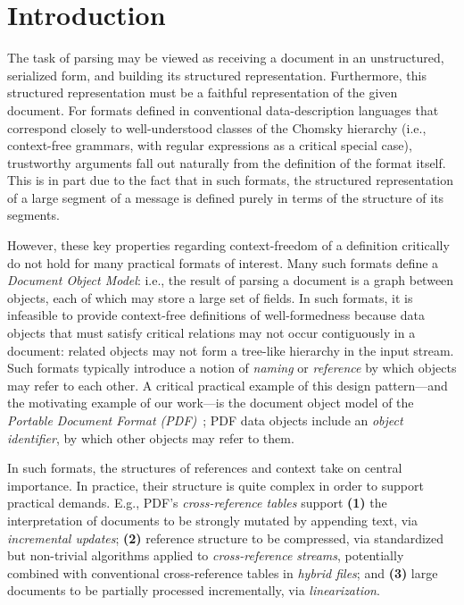 \section{Introduction}
\label{sec:intro}
The task of parsing may be viewed as receiving a document in an
unstructured, serialized form, and building its structured
representation. Furthermore, this structured representation must be a
faithful representation of the given document.
%
For formats defined in conventional data-description languages that
correspond closely to well-understood classes of the Chomsky hierarchy
(i.e., context-free grammars, with regular expressions as a critical
special case), trustworthy arguments fall out naturally from the
definition of the format itself.
%
This is in part due to the fact that in such formats, the structured
representation of a large segment of a message is defined purely in
terms of the structure of its segments.

However, these key properties regarding context-freedom of a
definition critically do not hold for many practical formats of
interest.
%
Many such formats define a \emph{Document Object Model}: i.e., the
result of parsing a document is a graph between objects, each
of which may store a large set of fields.
%
In such formats, it is infeasible to provide context-free definitions
of well-formedness because data objects that must satisfy critical
relations may not occur contiguously in a document: related objects
may not form a tree-like hierarchy in the input stream.
%
Such formats typically introduce a notion of \emph{naming} or
\emph{reference} by which objects may refer to each other.
%
A critical practical example of this design pattern---and the
motivating example of our work---is the document object model of the
\emph{Portable Document Format (PDF)}~\cite{isotc171sc2wg8ISO32000220202020};
%
PDF data objects include an \emph{object identifier}, by which other
objects may refer to them.

In such formats, the structures of references and context take on
central importance.
%
In practice, their structure is quite complex in order to support
practical demands.
%
E.g., PDF's \emph{cross-reference tables} support
% 
\textbf{(1)} the interpretation of documents to be strongly mutated by
appending text, via \emph{incremental updates};
%
\textbf{(2)} reference structure to be compressed, via standardized
but non-trivial algorithms applied to \emph{cross-reference streams},
potentially combined with conventional cross-reference tables in
\emph{hybrid files}; and
% 
\textbf{(3)} large documents to be partially processed incrementally,
via \emph{linearization}.

